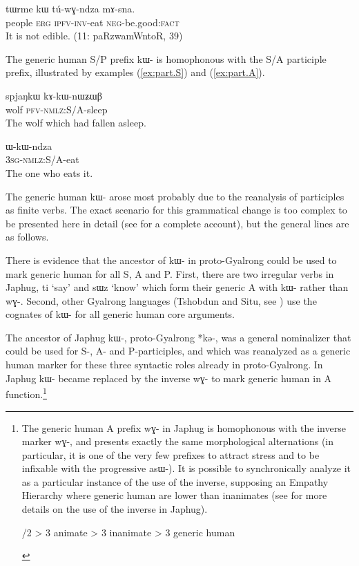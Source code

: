 \documentclass[oldfontcommands,oneside,a4paper,11pt]{article}
\newcommand{\ipa}[1]{\mbox{\phon #1}} %
\begin{document}
\begin{exe}
\ex  \label{ex:genr.tWrme}
\gll
\ipa{tɯrme} 	\ipa{kɯ} 	\ipa{tú-wɣ-ndza} 	\ipa{mɤ-sna.} \\
people \textsc{erg} \textsc{ipfv-inv}-eat \textsc{neg}-be.good:\textsc{fact} \\
\glt It is not edible. (11: paRzwamWntoR, 39)
\end{exe}

The generic human S/P prefix \ipa{kɯ-} is homophonous with the S/A participle prefix, illustrated by examples (\ref{ex:part.S}) and (\ref{ex:part.A}).

\begin{exe}
\ex \label{ex:part.S}
\gll \ipa{spjaŋkɯ}	\ipa{kɤ-kɯ-nɯʑɯβ}	\\
wolf \textsc{pfv-nmlz}:S/A-sleep \\
\glt The wolf which had fallen asleep.
\end{exe}

\begin{exe}
\ex \label{ex:part.A}
\gll \ipa{ɯ-kɯ-ndza} \\
\textsc{3sg-nmlz}:S/A-eat \\
\glt The one who eats it.
\end{exe}

The generic human \ipa{kɯ-} arose most probably due to the reanalysis of participles as finite verbs. The exact scenario for this grammatical change is too complex to be presented here in detail (see \citealt{jacques15generic} for a complete account), but the general lines are as follows.

There is evidence that the ancestor of \ipa{kɯ-} in proto-Gyalrong could be used to mark generic human for all S, A and P. First, there are two irregular verbs in Japhug, \ipa{ti} `say' and \ipa{sɯz} `know' which form their generic A with \ipa{kɯ-} rather than \ipa{wɣ-}. Second, other Gyalrong  languages (Tshobdun and Situ, see \citealt{sun14generic}) use the cognates of \ipa{kɯ-} for all generic human core arguments.
 
The ancestor of Japhug \ipa{kɯ-}, proto-Gyalrong *\ipa{kə-}, was a general nominalizer that could be used for S-, A- and P-participles, and which was reanalyzed as a generic human marker for these three syntactic roles already in proto-Gyalrong. In Japhug \ipa{kɯ-} became replaced by the inverse \ipa{wɣ-} to mark generic human in A function.\footnote{The generic human A prefix  \ipa{wɣ-} in Japhug is homophonous with the inverse marker \ipa{wɣ-}, and presents exactly the same morphological alternations (in particular, it is one of the very few prefixes to attract stress and to be infixable with the progressive \ipa{asɯ-}). It is possible to synchronically analyze it  as a particular instance of the use of the inverse, supposing an Empathy Hierarchy where generic human are lower than inanimates (see \citealt{jacques10inverse, jacques12demotion} for more details on the use of the inverse in Japhug). 

\begin{exe}
\ex 
{}/2 > 3 animate > 3 inanimate > 3 generic human
\end{exe}
}
\end{document}
